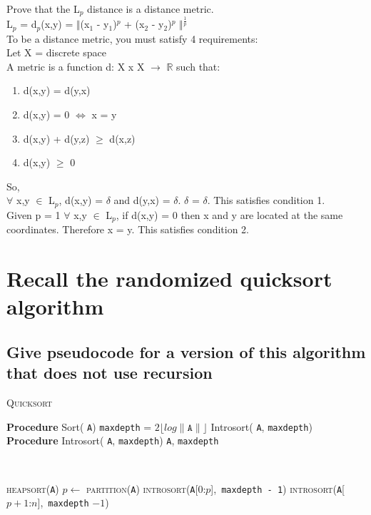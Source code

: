 \documentclass[10pt,letterpaper]{article}
\newcommand{\R}{\mathbb{R}}
\begin{document}
Prove that the L$_{p}$ distance is a distance metric.\\
L$_{p}$ = d$_{p}$(x,y) = $\Vert$(x$_{1}$ - y$_{1}$)$^{p}$ + (x$_{2}$ - y$_{2}$)$^{p}$ $\Vert$$^{\frac{1}{p}}$ \\
To be a distance metric, you must satisfy 4 requirements:\\
Let X = discrete space\\
A metric is a function d: X x X $\rightarrow$ $\R$ such that:
\begin{enumerate}
  \item d(x,y) = d(y,x)
  \item d(x,y) = 0 $\Leftrightarrow$ x = y
  \item d(x,y) + d(y,z) $\geq$ d(x,z)
  \item d(x,y) $\geq$ 0
\end{enumerate}
So,\\
$\forall$ x,y $\in$ L$_{p}$, d(x,y) = $\delta$ and d(y,x) = $\delta$. $\delta$ = $\delta$. This satisfies condition 1.\\
Given p = 1
$\forall$ x,y $\in$ L$_{p}$, if  d(x,y) = 0 then x and y are located at the same coordinates. Therefore x = y. This satisfies condition 2.


\section{Recall the randomized
quicksort algorithm}

\subsection{Give pseudocode for a version of this algorithm
that does not use recursion}


\begin{algorithm}\caption{\textsc{Quicksort}}\label{alg:Quicksort}
 \begin{algorithmic}[1]
 \State \textbf{Procedure} Sort( \texttt{A})
\State \texttt{maxdepth} = $2\lfloor \textit{log} \| \texttt{A} \|  \rfloor $
 \State Introsort( \texttt{A}, \texttt{maxdepth})
 \State ~
 \State \textbf{Procedure} Introsort( \texttt{A}, \texttt{maxdepth})
    \texttt{A}, \texttt{maxdepth}
   

\State ~

	\State \textsc{heapsort}(\texttt{A})
\Else
	\State $p \leftarrow$ \textsc{partition}(\texttt{A})
    \State \textsc{introsort}(\texttt{A}[0:$p$],\ \texttt{maxdepth - 1})
    \State \textsc{introsort}(\texttt{A}[$p + 1$:$n$],\ \texttt{maxdepth} $- 1$)
    
\EndIf

 \end{algorithmic}
\end{algorithm}
\end{document}

